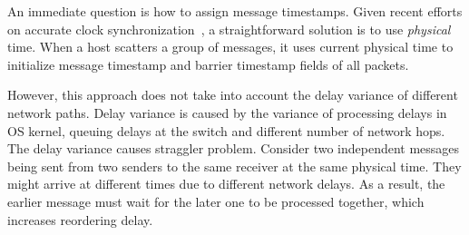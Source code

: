 
An immediate question is how to assign message timestamps. Given recent efforts on accurate clock synchronization~\cite{correll2005design,corbett2013spanner,lee2016globally,geng2018exploiting}, a straightforward solution is to use \emph{physical} time. When a host scatters a group of messages, it uses current physical time to initialize message timestamp and barrier timestamp fields of all packets.

However, this approach does not take into account the delay variance of different network paths. Delay variance is caused by the variance of processing delays in OS kernel, queuing delays at the switch and different number of network hops. The delay variance causes straggler problem. Consider two independent messages being sent from two senders to the same receiver at the same physical time. They might arrive at different times due to different network delays. As a result, the earlier message must wait for the later one to be processed together, which increases reordering delay.


